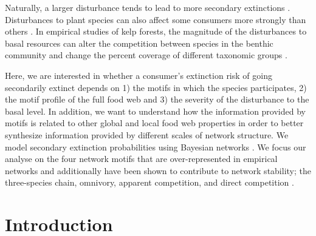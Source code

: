 \documentclass[12pt]{article}
\begin{document}
\begin{spacing}{2.0}
    
    Naturally, a larger disturbance tends to lead to more secondary extinctions \citep{}.
    Disturbances to plant species can also affect some consumers more strongly than others  \citep{byrnes2011climate}. 
    In empirical studies of kelp forests, the magnitude of the disturbances to basal resources can alter the competition between species in the benthic community \citep{detmer2021variation} and change the percent coverage of different taxonomic groups \citep{carnell2020more}. 
    
    

   Here, we are interested in whether a consumer's extinction risk of going secondarily extinct depends on 1) the motifs in which the species participates, 2) the motif profile of the full food web and 3) the severity of the disturbance to the basal level. %
    In addition, we want to understand how the information provided by motifs is related to other global and local food web properties in order to better synthesize information provided by different scales of network structure.
    We model secondary extinction probabilities using Bayesian networks \citep{Eklof2013, Haussler2020}. 
    We focus our analyse on the four network motifs that are over-represented in empirical networks and additionally have been shown to contribute to network stability; the three-species chain, omnivory, apparent competition, and direct competition \citep{Stouffer2007, Borrelli2015a, giling2019plant}.
   
    
      



\section*{Introduction} %


\end{spacing}
\end{document}

